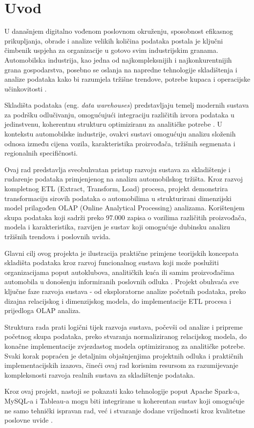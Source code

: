\section{Uvod}

U današnjem digitalno vođenom poslovnom okruženju, sposobnost efikasnog prikupljanja, obrade i analize velikih količina podataka postala je ključni čimbenik uspjeha za organizacije u gotovo svim industrijskim granama. Automobilska industrija, kao jedna od najkompleksnijih i najkonkurentnijih grana gospodarstva, posebno se oslanja na napredne tehnologije skladištenja i analize podataka kako bi razumjela tržišne trendove, potrebe kupaca i operacijske učinkovitosti \cite{Silva2021}.

Skladišta podataka (eng. \textit{data warehouses}) predstavljaju temelj modernih sustava za podršku odlučivanju, omogućujući integraciju različitih izvora podataka u jedinstvenu, koherentnu strukturu optimiziranu za analitičke potrebe \cite{Garani2019}. U kontekstu automobilske industrije, ovakvi sustavi omogućuju analizu složenih odnosa između cijena vozila, karakteristika proizvođača, tržišnih segmenata i regionalnih specifičnosti.

Ovaj rad predstavlja sveobuhvatan pristup razvoju sustava za skladištenje i rudarenje podataka primjenjenog na analizu automobilskog tržišta. Kroz razvoj kompletnog ETL (Extract, Transform, Load) procesa, projekt demonstrira transformaciju sirovih podataka o automobilima u strukturirani dimenzijski model prilagođen OLAP (Online Analytical Processing) analizama. Korištenjem skupa podataka koji sadrži preko 97.000 zapisa o vozilima različitih proizvođača, modela i karakteristika, razvijen je sustav koji omogućuje dubinsku analizu tržišnih trendova i poslovnih uvida.

Glavni cilj ovog projekta je ilustracija praktične primjene teorijskih koncepata skladišta podataka kroz razvoj funcionalnog sustava koji može poslužiti organizacijama poput autoklubova, analitičkih kuća ili samim proizvođačima automobila u donošenju informiranih poslovnih odluka \cite{Nima2018}. Projekt obuhvaća sve ključne faze razvoja sustava - od eksploratorne analize početnih podataka, preko dizajna relacijskog i dimenzijskog modela, do implementacije ETL procesa i prijedloga OLAP analiza.

Struktura rada prati logični tijek razvoja sustava, počevši od analize i pripreme početnog skupa podataka, preko stvaranja normaliziranog relacijskog modela, do konačne implementacije zvjezdastog modela optimiziranog za analitičke potrebe. Svaki korak popraćen je detaljnim objašnjenjima projektnih odluka i praktičnih implementacijskih izazova, čineći ovaj rad korisnim resursom za razumijevanje kompleksnosti razvoja realnih sustava za skladištenje podataka.

Kroz ovaj projekt, nastoji se pokazati kako tehnologije poput Apache Spark-a, MySQL-a i Tableau-a mogu biti integrirane u koherentan sustav koji omogućuje ne samo tehnički ispravan rad, već i stvaranje dodane vrijednosti kroz kvalitetne poslovne uvide \cite{Leka2025}.


